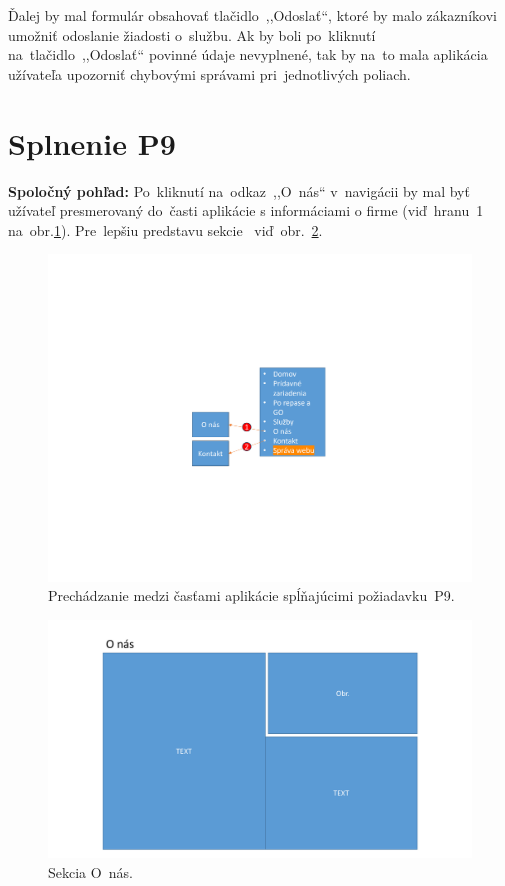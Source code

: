 Ďalej by mal formulár obsahovať tlačidlo~,,Odoslať``, ktoré by malo zákazníkovi umožniť odoslanie žiadosti o~službu. Ak by boli po~kliknutí na~tlačidlo~,,Odoslať`` povinné údaje nevyplnené, tak by na~to mala aplikácia užívateľa upozorniť chybovými správami pri~jednotlivých poliach.

\section{Splnenie P9}
\label{splnenie p9}

\textbf{Spoločný pohľad:} Po~kliknutí na~odkaz~,,O~nás`` v~navigácii by mal byť užívateľ presmerovaný do~časti aplikácie s informáciami o firme (viď~hranu~1 na~obr.\ref{p9 graph}). Pre~lepšiu predstavu sekcie~ viď~obr.~\ref{about}.

\begin{figure}[H]\centering
\includegraphics[width=140mm]{../img/UI concept/p9 graph}
\caption{Prechádzanie medzi časťami aplikácie spĺňajúcimi požiadavku~P9.}
\label{p9 graph}
\end{figure}

\begin{figure}[H]\centering
\includegraphics[width=140mm]{../img/UI concept/about}
\caption{Sekcia O~nás.}
\label{about}
\end{figure}

